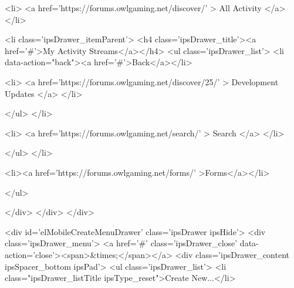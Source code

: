 									
										
										
										
											
												
													
													
									
													
									
									
									
										


	
		
			<li>
				<a href='https://forums.owlgaming.net/discover/' >
					All Activity
				</a>
			</li>
		
	

	
		
			
			<li class='ipsDrawer_itemParent'>
				<h4 class='ipsDrawer_title'><a href='#'>My Activity Streams</a></h4>
				<ul class='ipsDrawer_list'>
					<li data-action="back"><a href='#'>Back</a></li>
					
					


	
		
			<li>
				<a href='https://forums.owlgaming.net/discover/25/' >
					Development Updates
				</a>
			</li>
		
	

				</ul>
			</li>
		
	

	

	

	
		
			<li>
				<a href='https://forums.owlgaming.net/search/' >
					Search
				</a>
			</li>
		
	

	

										
								</ul>
							</li>
						
					
				
					
						
						
							<li><a href='https://forums.owlgaming.net/forms/' >Forms</a></li>
						
					
				
				
			</ul>

			
		</div>
	</div>
</div>

<div id='elMobileCreateMenuDrawer' class='ipsDrawer ipsHide'>
	<div class='ipsDrawer_menu'>
		<a href='#' class='ipsDrawer_close' data-action='close'><span>&times;</span></a>
		<div class='ipsDrawer_content ipsSpacer_bottom ipsPad'>
			<ul class='ipsDrawer_list'>
				<li class="ipsDrawer_listTitle ipsType_reset">Create New...</li>
				
